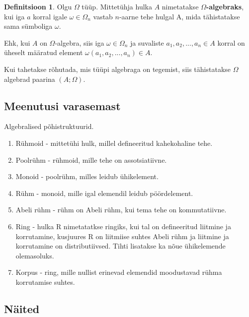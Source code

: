 \documentclass[12pt]{report}
\numberwithin{equation}{section}
\theoremstyle{definition}
\newtheorem{omega_algebra}[equation]{Definitsioon}
\theoremstyle{plain}
\begin{document}
\begin{omega_algebra} Olgu $\Omega$ tüüp. Mittet\"uhja hulka $A$ nimetatakse \textbf{$\Omega$-algebraks}, kui iga $a$ korral igale $\omega \in \Omega_n$ vastab $n$-aarne tehe hulgal A, mida tähistatakse sama s\"umboliga $\omega$. 
\end{omega_algebra}

Ehk, kui $A$ on $\Omega$-algebra, siis iga $\omega \in \Omega_n$ ja suvaliste $a_1,a_2,...,a_n \in A$ korral on \"uheselt määratud element $\omega \left( a_1,a_2,...,a_n \right) \in A$. 

Kui tahetakse rõhutada, mis t\"u\"upi algebraga on tegemist, siis tähistatakse $\Omega$ algebrad paarina $(A;\Omega)$.


\colorbox{background_example}{\parbox{\textwidth}{
\section*{Meenutusi varasemast}
Algebralised põhistruktuurid.
\begin{enumerate}[I]
\item R\"uhmoid - mittet\"uhi hulk, millel defineeritud kahekohaline tehe.
\item Poolr\"uhm - r\"uhmoid, mille tehe on assotsiatiivne.
\item Monoid - poolr\"uhm, milles leidub \"uhikelement.
\item R\"uhm - monoid, mille igal elemendil leidub pöördelement.
\item Abeli r\"uhm - r\"uhm on Abeli r\"uhm, kui tema tehe on kommutatiivne.
\item Ring - hulka R nimetatatkse ringiks, kui tal on defineeritud liitmine ja korrutamine, kusjuures R on liitmiise suhtes Abeli r\"uhm ja liitmine ja korrutamine on distributiivsed. Tihti lisatakse ka nõue \"uhikelemende olemasoluks.
\item Korpus - ring, mille nullist erinevad elemendid moodustavad r\"uhma korrutamise suhtes.
\end{enumerate}
}}
\subsection*{Näited}
\end{document}
